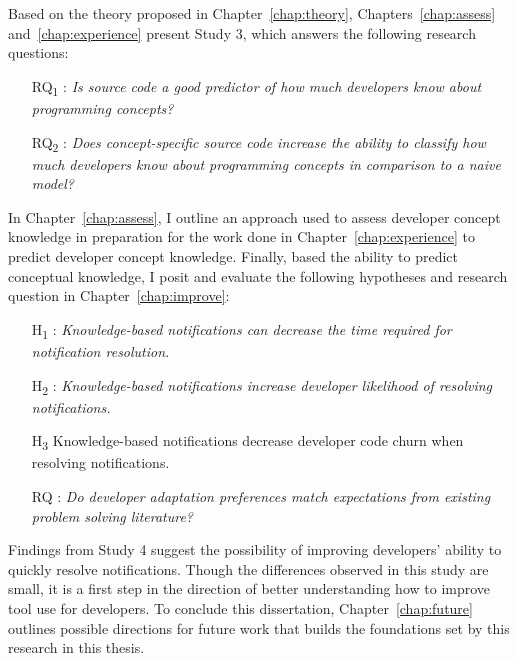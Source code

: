 \vspace{1em}


Based on the theory proposed in Chapter~\ref{chap:theory}, Chapters~\ref{chap:assess} and~\ref{chap:experience} present Study 3, which answers the following research questions:
\begin{itemize}
    \item [RQ\textsubscript{1}]: \textit{Is source code a good predictor of how much developers know about programming concepts?}
	\item [RQ\textsubscript{2}]: \textit{Does concept-specific source code increase the ability to classify how much developers know about programming concepts in comparison to a naive model?}
\end{itemize}

In Chapter~\ref{chap:assess}, I outline an approach used to assess developer concept knowledge in preparation for the work done in Chapter~\ref{chap:experience} to predict developer concept knowledge.
Finally, based the ability to predict conceptual knowledge, I posit and evaluate the following hypotheses and research question in Chapter~\ref{chap:improve}:
\begin{itemize}
    \item [H\textsubscript{1}]: \textit{Knowledge-based notifications can decrease the time required for notification resolution.}
    \item [H\textsubscript{2}]: \textit{Knowledge-based notifications increase developer likelihood of resolving notifications. }
    \item [H\textsubscript{3}] Knowledge-based notifications decrease developer code churn when resolving notifications.
    \item[RQ]: \textit{Do developer adaptation preferences match expectations from existing problem solving literature?}
\end{itemize}

Findings from Study 4 suggest the possibility of improving developers' ability to quickly resolve notifications. Though the differences observed in this study are small, it is a first step in the direction of better understanding how to improve tool use for developers. To conclude this dissertation, Chapter~\ref{chap:future} outlines possible directions for future work that builds the foundations set by this research in this thesis.

